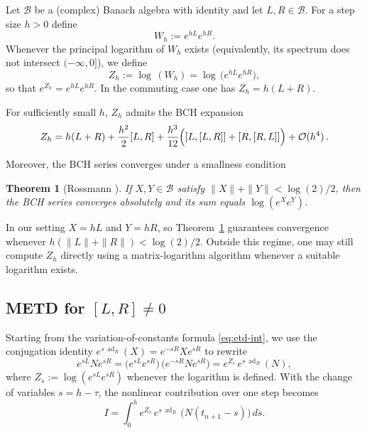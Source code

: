 \documentclass[12pt]{article}
\newtheorem{thm}{Theorem}
\DeclareMathOperator{\ad}{ad}
\begin{document}
Let $\mathcal{B}$ be a (complex) Banach algebra with identity and let $L,R\in\mathcal{B}$.
For a step size $h>0$ define
\begin{equation*}
W_h := e^{hL}e^{hR}.
\end{equation*}
Whenever the principal logarithm of $W_h$ exists (equivalently, its spectrum does not intersect $(-\infty,0]$), we define
\begin{equation}
\label{eq:Zh_def}
Z_h := \log\,(W_h)=\log\,\bigl(e^{hL}e^{hR}\bigr),
\end{equation}
so that $e^{Z_h}=e^{hL}e^{hR}$. In the commuting case one has $Z_h=h(L+R)$.

For sufficiently small $h$, $Z_h$ admits the BCH expansion
\begin{equation}
\label{eq:BCH_series}
Z_h
= h(L+R)
+ \frac{h^2}{2}[L,R]
+ \frac{h^3}{12}\Bigl([L,[L,R]] + [R,[R,L]]\Bigr)
+ \mathcal{O}(h^4)\,.
\end{equation}

Moreover, the BCH series converges under a smallness condition

\begin{thm}[Rossmann \cite{rossmann2006lie}]
\label{thm:BCH_convergence}
If $X,Y\in\mathcal{B}$ satisfy $\|X\|+\|Y\|<\log(2)/2$, then the BCH series converges
absolutely and its sum equals $\log(e^Xe^Y)$.
\end{thm}

In our setting $X=hL$ and $Y=hR$, so Theorem~\ref{thm:BCH_convergence} guarantees convergence
whenever $h(\|L\|+\|R\|)<\log(2)/2$. Outside this regime, one may still compute $Z_h$
directly using a matrix-logarithm algorithm whenever a suitable logarithm exists. \\

\subsection{METD for $[L,R] \neq 0$}
Starting from the variation-of-constants formula \eqref{eq:etd-int}, we use the conjugation
identity $e^{s\,\ad_R}(X)=e^{-sR}Xe^{sR}$ to rewrite
\begin{equation}
\label{eq:conjugation_BCH}
e^{sL} N e^{sR}
= \bigl(e^{sL}e^{sR}\bigr)\,\bigl(e^{-sR}Ne^{sR}\bigr)
= e^{Z_s}\,e^{s\,\ad_R}(N),
\end{equation}
where $Z_s:=\log(e^{sL}e^{sR})$ whenever the logarithm is defined.
With the change of variables $s=h-\tau$, the nonlinear contribution over one step becomes
\begin{equation}
\label{eq:exact_integral_BCH}
I = \int_0^h e^{Z_s}\,e^{s\,\ad_R}\,\bigl(N(t_{n+1}-s)\bigr)\,ds.
\end{equation}
\end{document}
